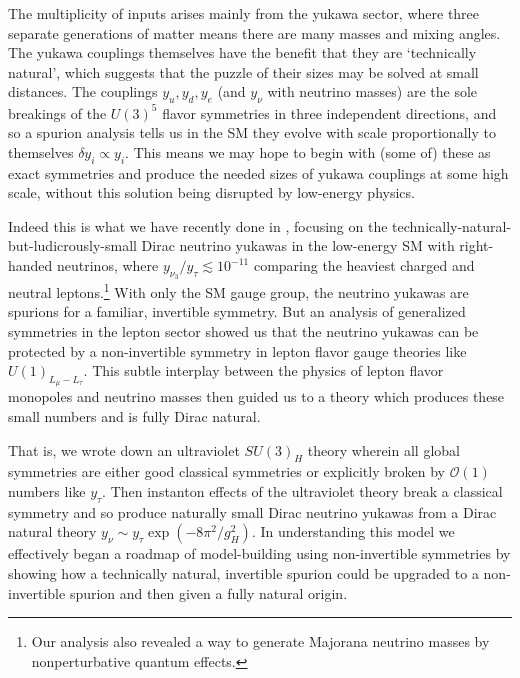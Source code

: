 \documentclass[11pt,a4paper]{article}
\begin{document}
The multiplicity of inputs arises mainly from the yukawa sector, where three separate generations of matter means there are many masses and mixing angles. The yukawa couplings themselves have the benefit that they are `technically natural', which suggests that the puzzle of their sizes may be solved at small distances. The couplings $y_u, y_d, y_e$ (and $y_\nu$ with neutrino masses) are the sole breakings of the $U(3)^5$ flavor symmetries in three independent directions, and so a spurion analysis tells us in the SM they evolve with scale proportionally to themselves $\delta y_i \propto y_i$. This means we may hope to begin with (some of) these as exact symmetries and produce the needed sizes of yukawa couplings at some high scale, without this solution being disrupted by low-energy physics. 

Indeed this is what we have recently done in \cite{Cordova:2022fhg}, focusing on the technically-natural-but-ludicrously-small Dirac neutrino yukawas in the low-energy SM with right-handed neutrinos, where $y_{\nu_3}/y_{\tau} \lesssim 10^{-11}$ comparing the heaviest charged and neutral leptons.\footnote{Our analysis also revealed a way to generate Majorana neutrino masses by nonperturbative quantum effects.} 
With only the SM gauge group, the neutrino yukawas are spurions for a familiar, invertible symmetry. 
But an analysis of generalized symmetries in the lepton sector showed us that the neutrino yukawas can be protected by a non-invertible symmetry in lepton flavor gauge theories like $U(1)_{L_\mu - L_\tau}$.
This subtle interplay between the physics of lepton flavor monopoles and neutrino masses then guided us to a theory which produces these small numbers and is fully Dirac natural. 

That is, we wrote down an ultraviolet $SU(3)_H$ theory wherein all global symmetries are either good classical symmetries or explicitly broken by $\mathcal{O}(1)$ numbers like $y_\tau$.  
Then instanton effects of the ultraviolet theory break a classical symmetry and so produce naturally small Dirac neutrino yukawas from a Dirac natural theory $y_\nu \sim y_\tau \exp(-8\pi^2/g_H^2)$.
In understanding this model we effectively began a roadmap of model-building using non-invertible symmetries by showing how a technically natural, invertible spurion could be upgraded to a non-invertible spurion and then given a fully natural origin.
\end{document}
